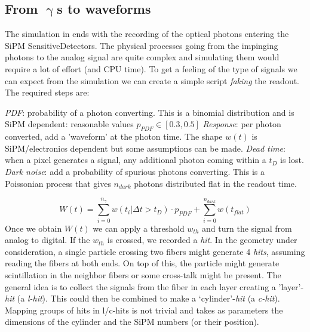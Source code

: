 \begin{refsection}
    \subsection{From $\upgamma$s to waveforms}
        The simulation in \gf ends with the recording of the optical photons entering the SiPM SensitiveDetectors.
        The physical processes going from the impinging photons to the analog signal are quite complex and simulating them would require a lot of effort (and CPU time).
        To get a feeling of the type of signals we can expect from the simulation we can create a simple script \textit{faking} the readout.
        The required steps are:
        \begin{outline}
            \1 \textit{PDF}: probability of a photon converting. 
            This is a binomial distribution and is SiPM dependent: reasonable values $p_{PDF}\in [0.3, 0.5]$
            \1 \textit{Response}: per photon converted, add a 'waveform' at the photon time. 
            The shape $w(t)$ is SiPM/electronics dependent but some assumptions can be made.
            \1 \textit{Dead time}: when a pixel generates a signal, any additional photon coming within a $t_D$ is lost.
            \1 \textit{Dark noise}: add a probability of spurious photons converting. 
            This is a Poissonian process that gives $n_{dark}$ photons distributed flat in the readout time.
        \end{outline}
        \begin{equation}
            W(t)=\sum_{i=0}^{n_\gamma} w(t_i|\Delta t>t_D)\cdot p_{PDF} + \sum_{i=0}^{n_{dark}} w(t_{flat}) 
        \end{equation}
        Once we obtain $W(t)$ we can apply a threshold $w_{th}$ and turn the signal from analog to digital. 
        If the $w_{th}$ is crossed, we recorded a \textit{hit}.
        In the geometry under consideration, a single particle crossing two fibers might generate 4 \textit{hits}, assuming reading the fibers at both ends.
        On top of this, the particle might generate scintillation in the neighbor fibers or some cross-talk might be present. 
        The general idea is to collect the signals from the fiber in each layer creating a 'layer'-\textit{hit} (a \textit{l-hit}). 
        This could then be combined to make a `cylinder'-\textit{hit} (a \textit{c-hit}).
        Mapping groups of hits in l/c-hits is not trivial and takes as parameters the dimensions of the cylinder and the SiPM numbers (or their position).


\end{refsection}
